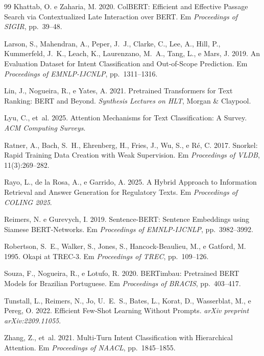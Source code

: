 \documentclass[11pt]{article}
\begin{document}
\begin{thebibliography}{99}
Khattab, O. e Zaharia, M. 2020.
\newblock ColBERT: Efficient and Effective Passage Search via Contextualized Late Interaction over BERT.
\newblock Em \emph{Proceedings of SIGIR}, pp.~39--48.

Larson, S., Mahendran, A., Peper, J.~J., Clarke, C., Lee, A., Hill, P., Kummerfeld, J.~K., Leach, K., Laurenzano, M.~A., Tang, L., e Mars, J. 2019.
\newblock An Evaluation Dataset for Intent Classification and Out-of-Scope Prediction.
\newblock Em \emph{Proceedings of EMNLP-IJCNLP}, pp.~1311--1316.

Lin, J., Nogueira, R., e Yates, A. 2021.
\newblock Pretrained Transformers for Text Ranking: BERT and Beyond.
\newblock \emph{Synthesis Lectures on HLT}, Morgan \& Claypool.

Lyu, C., et~al. 2025.
\newblock Attention Mechanisms for Text Classification: A Survey.
\newblock \emph{ACM Computing Surveys}.

Ratner, A., Bach, S.~H., Ehrenberg, H., Fries, J., Wu, S., e R\'{e}, C. 2017.
\newblock Snorkel: Rapid Training Data Creation with Weak Supervision.
\newblock Em \emph{Proceedings of VLDB}, 11(3):269--282.

Rayo, L., de la Rosa, A., e Garrido, A. 2025.
\newblock A Hybrid Approach to Information Retrieval and Answer Generation for Regulatory Texts.
\newblock Em \emph{Proceedings of COLING 2025}.

Reimers, N. e Gurevych, I. 2019.
\newblock Sentence-BERT: Sentence Embeddings using Siamese BERT-Networks.
\newblock Em \emph{Proceedings of EMNLP-IJCNLP}, pp.~3982--3992.

Robertson, S.~E., Walker, S., Jones, S., Hancock-Beaulieu, M., e Gatford, M. 1995.
\newblock Okapi at TREC-3.
\newblock Em \emph{Proceedings of TREC}, pp.~109--126.

Souza, F., Nogueira, R., e Lotufo, R. 2020.
\newblock BERTimbau: Pretrained BERT Models for Brazilian Portuguese.
\newblock Em \emph{Proceedings of BRACIS}, pp.~403--417.

Tunstall, L., Reimers, N., Jo, U.~E.~S., Bates, L., Korat, D., Wasserblat, M., e Pereg, O. 2022.
\newblock Efficient Few-Shot Learning Without Prompts.
\newblock \emph{arXiv preprint arXiv:2209.11055}.

Zhang, Z., et~al. 2021.
\newblock Multi-Turn Intent Classification with Hierarchical Attention.
\newblock Em \emph{Proceedings of NAACL}, pp.~1845--1855.

\end{thebibliography}
\endgroup
\end{document}
